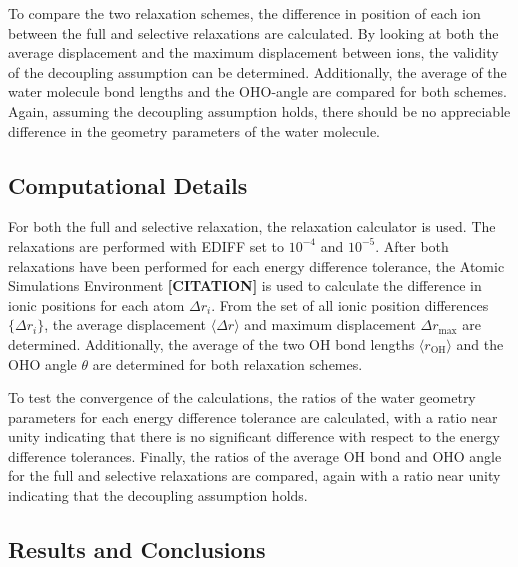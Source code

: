             To compare the two relaxation schemes, the difference in position of each ion between the full and selective relaxations are calculated. By looking at both the average displacement and the maximum displacement between ions, the validity of the decoupling assumption can be determined. Additionally, the average of the water molecule bond lengths and the OHO-angle are compared for both schemes. Again, assuming the decoupling assumption holds, there should be no appreciable difference in the geometry parameters of the water molecule.
        \subsection{Computational Details}
            For both the full and selective relaxation, the relaxation calculator is used. The relaxations are performed with EDIFF set to $10^{-4}$ and $10^{-5}$. After both relaxations have been performed for each energy difference tolerance, the Atomic Simulations Environment \textbf{[CITATION]} is used to calculate the difference in ionic positions for each atom $\Delta r_i$. From the set of all ionic position differences $\{\Delta r_i \}$, the average displacement $\langle \Delta r \rangle$ and maximum displacement $\Delta r_\text{max}$ are determined. Additionally, the average of the two OH bond lengths $\langle r_\text{OH} \rangle$ and the OHO angle $\theta$ are determined for both relaxation schemes.
            
            To test the convergence of the calculations, the ratios of the water geometry parameters for each energy difference tolerance are calculated, with a ratio near unity indicating that there is no significant difference with respect to the energy difference tolerances. Finally, the ratios of the average OH bond and OHO angle for the full and selective relaxations are compared, again with a ratio near unity indicating that the decoupling assumption holds.
        \subsection{Results and Conclusions}
        
